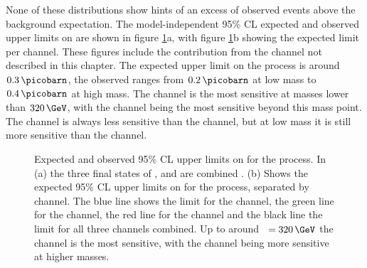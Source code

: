 None of these distributions show hints of an excess of observed events above the background expectation. 
The model-independent 95\% \ac{CL} expected and observed upper limits
on \xsbr are shown in 
figure \ref{fig:hhh_results_modelindep}a, with figure \ref{fig:hhh_results_modelindep}b 
showing the expected limit per channel. These figures include the contribution from the 
\tautau channel not described in this chapter. The expected upper limit
on the \Htohhtobbtautau process is around $0.3\,\picobarn$, the observed ranges
from $0.2\,\picobarn$ at low mass to $0.4\,\picobarn$ at high mass. 
The \mutau channel is the most sensitive at masses lower than $320\,\GeV$, with 
the \tautau channel being the most sensitive beyond this mass point. The \etau channel is always
less sensitive than the \mutau channel, but at low mass it is still more sensitive than the \tautau 
channel.

\begin{figure}[h!]
\begin{center}
\caption[Expected and observed 95\% CL upper limits on 
\xsbr for the \Htohhtobbtautau process.]{Expected and observed 95\% \ac{CL} upper limits on \xsbr  
for the \Htohhtobbtautau process. In (a) the three final states of \etau, \mutau and \tautau are combined \cite{CMS-HIG-14-034}.
(b) Shows the expected 95\% \ac{CL} upper limits on \xsbr for the \Htohhtobbtautau
process, separated by channel. The blue line shows the limit for the \tautau channel, the green line for the \mutau channel, the red line
for the \etau channel and the black line the limit for all three channels combined. Up to around \mH~$= 320\,\GeV$ the \mutau channel is the most
sensitive, with the \tautau channel being more sensitive at higher masses.}
\label{fig:hhh_results_modelindep}
\end{center}
\end{figure}

